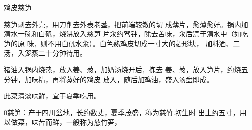 \begin{recipe}{鸡皮慈笋}

\ingredients



\cooking

慈笋剥去外壳，用刀削去外表老茎，把前端较嫩的切 成薄片，愈薄愈好。锅内加清水一碗和白矾，烧沸放入慈笋 片汆约驾钟，除去苦味，汆后漂于清水中（如吃笋的原 味，则不用白矾水汆）。白色熟鸡皮切成一寸大的菱形块， 加料酒、二汤，入笼蒸二十分钟待用。

\step 猪油入锅内烧热，放入姜、葱，加奶汤烧开后，拣去 姜、葱，放入笋片，约烧五分钟，加味精，再将蒸好的鸡皮 放入，随后加鸡油，盛入汤盘即成。

\notes

此菜清淡味鲜，宜于夏季吃用。

0慈笋：产于四川盆地，长约数丈，夏季茂盛，称为慈竹.初生时 出土约五寸，用以做菜，味苦而鲜，一般称为慈竹笋，

\end{recipe}


